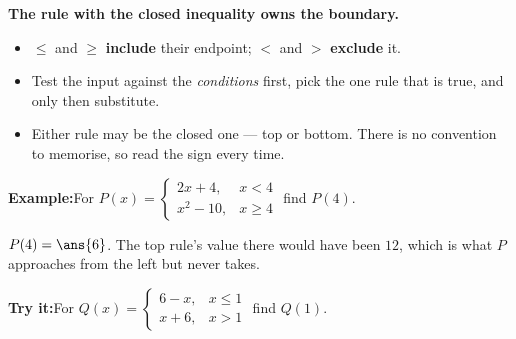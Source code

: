 \documentclass[12pt]{article}
\begin{document}


\begin{formulabox}
\textbf{The rule with the closed inequality owns the boundary.}
\begin{itemize}[leftmargin=0.8cm, itemsep=1pt, topsep=2pt]
  \item $\le$ and $\ge$ \textbf{include} their endpoint; $<$ and $>$ \textbf{exclude} it.
  \item Test the input against the \emph{conditions} first, pick the one rule that
        is true, and only then substitute.
  \item Either rule may be the closed one --- top or bottom. There is no
        convention to memorise, so read the sign every time.
\end{itemize}
\end{formulabox}

\begin{examplebox}
\textbf{Example:}\quad For
$P(x) = \begin{cases} 2x + 4, & x < 4 \\ x^2 - 10, & x \ge 4 \end{cases}$
find $P(4)$.



$P(4) = \ans{6}$. The top rule's value there would have been $12$, which is what
$P$ approaches from the left but never takes.
\end{examplebox}

\begin{tryitbox}
\textbf{Try it:}\quad For
$Q(x) = \begin{cases} 6 - x, & x \le 1 \\ x + 6, & x > 1 \end{cases}$
find $Q(1)$.

\end{tryitbox}

\end{document}
